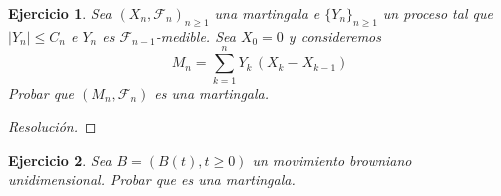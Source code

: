 \documentclass[a4paper,11pt]{article}
\newcommand{\abs}[1]{\ensuremath{\left\lvert #1 \right\rvert}}
\newcommand{\Sig}[1]{\ensuremath{\mathcal{#1}}}
\newtheorem*{ej}{Ejercicio}
\begin{document}

\begin{ej}
    Sea $(X_n, \Sig{F}_n)_{n \geq 1}$ una martingala e $\{Y_n\}_{n \geq 1}$ un proceso tal
    que $\abs{Y_n} \leq C_n$ e $Y_n$ es $\Sig{F}_{n−1}$-medible. Sea $X_0 = 0$ y consideremos
    $$M_n = \displaystyle \sum_{k = 1}^{n}{Y_k \, (X_k − X_{k−1})}$$
    Probar que $(M_n, \Sig{F}_n)$ es una martingala. 
\end{ej}

\begin{proof}[Resoluci\'on]

\end{proof}


\begin{ej}
Sea $B = (B(t), t \geq 0)$ un movimiento browniano unidimensional. Probar que es una martingala.
\end{ej}
\end{document}
